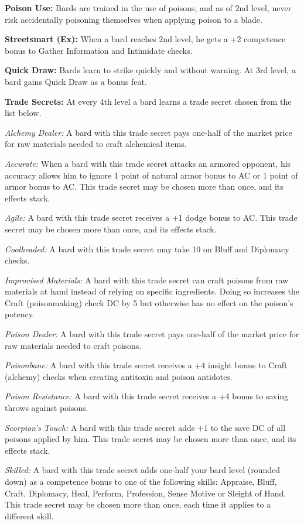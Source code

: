 \textbf{Poison Use:} Bards are trained in the use of poisons, and as of 2nd level, never risk accidentally poisoning themselves when applying poison to a blade.

\textbf{Streetsmart (Ex):} When a bard reaches 2nd level, he gets a +2 competence bonus to Gather Information and Intimidate checks.

\textbf{Quick Draw:} Bards learn to strike quickly and without warning. At 3rd level, a bard gains Quick Draw as a bonus feat.

\textbf{Trade Secrets:} At every 4th level a bard learns a trade secret chosen from the list below.

\textit{Alchemy Dealer:} A bard with this trade secret pays one‐half of the market price for raw materials needed to craft alchemical items.

\textit{Accurate:} When a bard with this trade secret attacks an armored opponent, his accuracy allows him to ignore 1 point of natural armor bonus to AC or 1 point of armor bonus to AC. This trade secret may be chosen more than once, and its effects stack.

\textit{Agile:} A bard with this trade secret receives a +1 dodge bonus to AC. This trade secret may be chosen more than once, and its effects stack.

\textit{Coolheaded:} A bard with this trade secret may take 10 on Bluff and Diplomacy checks.

\textit{Improvised Materials:} A bard with this trade secret can craft poisons from raw materials at hand instead of relying on specific ingredients. Doing so increases the Craft (poisonmaking) check DC by 5 but otherwise has no effect on the poison's potency.

\textit{Poison Dealer:} A bard with this trade secret pays one‐half of the market price for raw materials needed to craft poisons.

\textit{Poisonbane:} A bard with this trade secret receives a +4 insight bonus to Craft (alchemy) checks when creating antitoxin and poison antidotes.

\textit{Poison Resistance:} A bard with this trade secret receives a +4 bonus to saving throws against poisons.

\textit{Scorpion's Touch:} A bard with this trade secret adds +1 to the save DC of all poisons applied by him. This trade secret may be chosen more than once, and its effects stack.

\textit{Skilled:} A bard with this trade secret adds one‐half your bard level (rounded down) as a competence bonus to one of the following skills: Appraise, Bluff, Craft, Diplomacy, Heal, Perform, Profession, Sense Motive or Sleight of Hand. This trade secret may be chosen more than once, each time it applies to a different skill.

